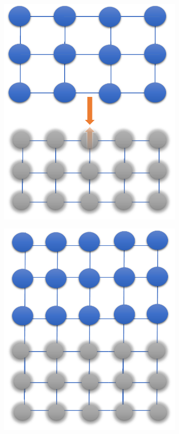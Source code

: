 \begin{figure}
	\begin{subfigure}[b]{0.3\textwidth}
		\centering
		\includegraphics[width=.85\linewidth]{Figs/Ch1/MDa}
		\caption{}
	
	\end{subfigure}%
	\hspace*{0.5cm}
	\begin{subfigure}[b]{0.3\textwidth}
		\centering
		\includegraphics[width=.85\linewidth]{Figs/Ch1/MDb}
		\caption{}
		

\end{subfigure}
\end{figure}
